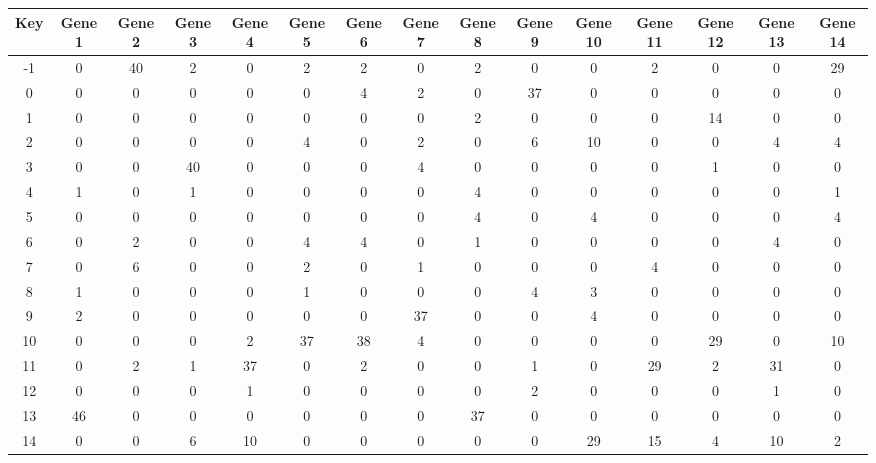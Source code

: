 \begin{tabular}{|c|c|c|c|c|c|c|c|c|c|c|c|c|c|c|}
\hline
Key & Gene 1 & Gene 2 & Gene 3 & Gene 4 & Gene 5 & Gene 6 & Gene 7 & Gene 8 & Gene 9 & Gene 10 & Gene 11 & Gene 12 & Gene 13 & Gene 14 \\
\hline
-1 & 0 & 40 & 2 & 0 & 2 & 2 & 0 & 2 & 0 & 0 & 2 & 0 & 0 & 29 \\
0 & 0 & 0 & 0 & 0 & 0 & 4 & 2 & 0 & 37 & 0 & 0 & 0 & 0 & 0 \\
1 & 0 & 0 & 0 & 0 & 0 & 0 & 0 & 2 & 0 & 0 & 0 & 14 & 0 & 0 \\
2 & 0 & 0 & 0 & 0 & 4 & 0 & 2 & 0 & 6 & 10 & 0 & 0 & 4 & 4 \\
3 & 0 & 0 & 40 & 0 & 0 & 0 & 4 & 0 & 0 & 0 & 0 & 1 & 0 & 0 \\
4 & 1 & 0 & 1 & 0 & 0 & 0 & 0 & 4 & 0 & 0 & 0 & 0 & 0 & 1 \\
5 & 0 & 0 & 0 & 0 & 0 & 0 & 0 & 4 & 0 & 4 & 0 & 0 & 0 & 4 \\
6 & 0 & 2 & 0 & 0 & 4 & 4 & 0 & 1 & 0 & 0 & 0 & 0 & 4 & 0 \\
7 & 0 & 6 & 0 & 0 & 2 & 0 & 1 & 0 & 0 & 0 & 4 & 0 & 0 & 0 \\
8 & 1 & 0 & 0 & 0 & 1 & 0 & 0 & 0 & 4 & 3 & 0 & 0 & 0 & 0 \\
9 & 2 & 0 & 0 & 0 & 0 & 0 & 37 & 0 & 0 & 4 & 0 & 0 & 0 & 0 \\
10 & 0 & 0 & 0 & 2 & 37 & 38 & 4 & 0 & 0 & 0 & 0 & 29 & 0 & 10 \\
11 & 0 & 2 & 1 & 37 & 0 & 2 & 0 & 0 & 1 & 0 & 29 & 2 & 31 & 0 \\
12 & 0 & 0 & 0 & 1 & 0 & 0 & 0 & 0 & 2 & 0 & 0 & 0 & 1 & 0 \\
13 & 46 & 0 & 0 & 0 & 0 & 0 & 0 & 37 & 0 & 0 & 0 & 0 & 0 & 0 \\
14 & 0 & 0 & 6 & 10 & 0 & 0 & 0 & 0 & 0 & 29 & 15 & 4 & 10 & 2 \\
\hline
\end{tabular}